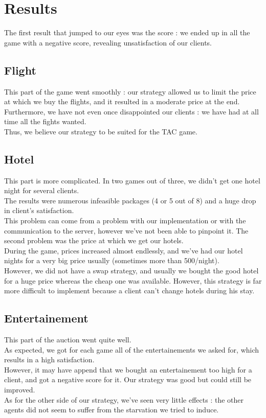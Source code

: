\section{Results}

The first result that jumped to our eyes was the score : we ended up in all the game with a negative score, revealing unsatisfaction of our clients.

\subsection{Flight}
This part of the game went smoothly : our strategy allowed us to limit the price at which we buy the flights, and it resulted in a moderate price at the end.\\
Furthermore, we have not even once disappointed our clients : we have had at all time all the fights wanted.\\
Thus, we believe our strategy to be suited for the TAC game.

\subsection{Hotel}
This part is more complicated. In two games out of three, we didn't get one hotel night for several clients.\\
The results were numerous infeasible packages (4 or 5 out of 8) and a huge drop in client's satisfaction.\\
This problem can come from a problem with our implementation or with the communication to the server, however we've not been able to pinpoint it.
The second problem was the price at which we get our hotels.\\
During the game, prices increased almost endlessly, and we've had our hotel nights for a very big price usually (sometimes more than 500/night).\\
However, we did not have a swap strategy, and usually we bought the good hotel for a huge price whereas the cheap one was available. However, this strategy is far more difficult to implement because a client can't change hotels during his stay.

\subsection{Entertainement}
This part of the auction went quite well.\\
As expected, we got for each game all of the entertainements we asked for, which results in a high satisfaction.\\
However, it may have append that we bought an entertainement too high for a client, and got a negative score for it. Our strategy was good but could still be improved.\\
As for the other side of our strategy, we've seen very little effects : the other agents did not seem to suffer from the starvation we tried to induce.

